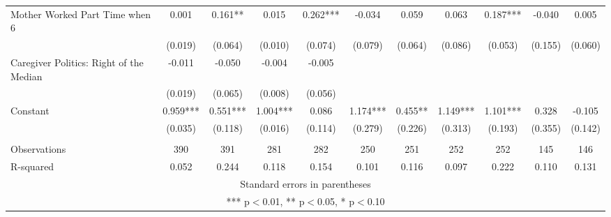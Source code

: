 \begin{tabular}{lcccccccccc}
Mother Worked Part Time when 6 & 0.001 & 0.161** & 0.015 & 0.262*** & -0.034 & 0.059 & 0.063 & 0.187*** & -0.040 & 0.005 \\
 & (0.019) & (0.064) & (0.010) & (0.074) & (0.079) & (0.064) & (0.086) & (0.053) & (0.155) & (0.060) \\
Caregiver Politics: Right of the Median & -0.011 & -0.050 & -0.004 & -0.005 &  &  &  &  &  &  \\
 & (0.019) & (0.065) & (0.008) & (0.056) &  &  &  &  &  &  \\
Constant & 0.959*** & 0.551*** & 1.004*** & 0.086 & 1.174*** & 0.455** & 1.149*** & 1.101*** & 0.328 & -0.105 \\
 & (0.035) & (0.118) & (0.016) & (0.114) & (0.279) & (0.226) & (0.313) & (0.193) & (0.355) & (0.142) \\
 &  &  &  &  &  &  &  &  &  &  \\
Observations & 390 & 391 & 281 & 282 & 250 & 251 & 252 & 252 & 145 & 146 \\
 R-squared & 0.052 & 0.244 & 0.118 & 0.154 & 0.101 & 0.116 & 0.097 & 0.222 & 0.110 & 0.131 \\ \hline
\multicolumn{11}{c}{ Standard errors in parentheses} \\
\multicolumn{11}{c}{ *** p$<$0.01, ** p$<$0.05, * p$<$0.10} \\
\end{tabular}
